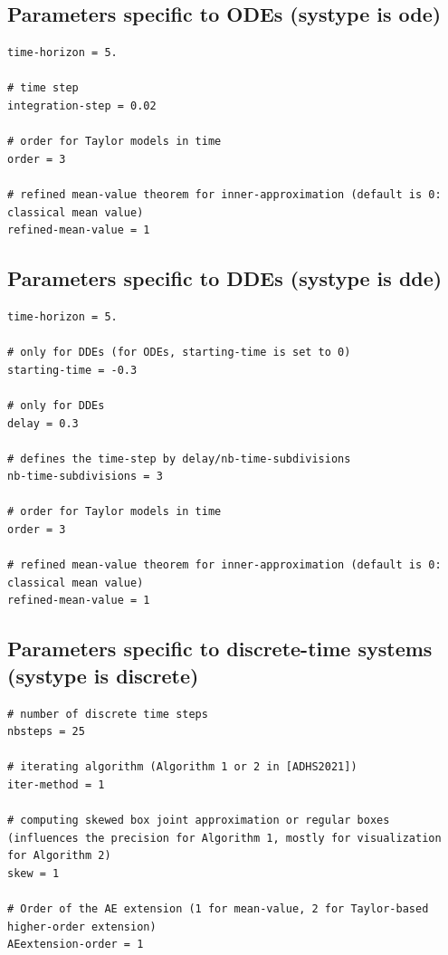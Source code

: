 \documentclass{article}
\begin{document}
\subsection{Parameters specific to ODEs (systype is ode)}

\begin{verbatim}
time-horizon = 5.

# time step
integration-step = 0.02

# order for Taylor models in time
order = 3

# refined mean-value theorem for inner-approximation (default is 0: classical mean value)
refined-mean-value = 1
\end{verbatim}

\subsection{Parameters specific to DDEs (systype is dde)}

\begin{verbatim}
time-horizon = 5.

# only for DDEs (for ODEs, starting-time is set to 0)
starting-time = -0.3

# only for DDEs
delay = 0.3 

# defines the time-step by delay/nb-time-subdivisions
nb-time-subdivisions = 3

# order for Taylor models in time
order = 3

# refined mean-value theorem for inner-approximation (default is 0: classical mean value)
refined-mean-value = 1
\end{verbatim}

\subsection{Parameters specific to discrete-time systems (systype is discrete)}

\begin{verbatim}
# number of discrete time steps
nbsteps = 25

# iterating algorithm (Algorithm 1 or 2 in [ADHS2021])
iter-method = 1

# computing skewed box joint approximation or regular boxes (influences the precision for Algorithm 1, mostly for visualization for Algorithm 2)
skew = 1

# Order of the AE extension (1 for mean-value, 2 for Taylor-based higher-order extension)
AEextension-order = 1
\end{verbatim}
\end{document}

